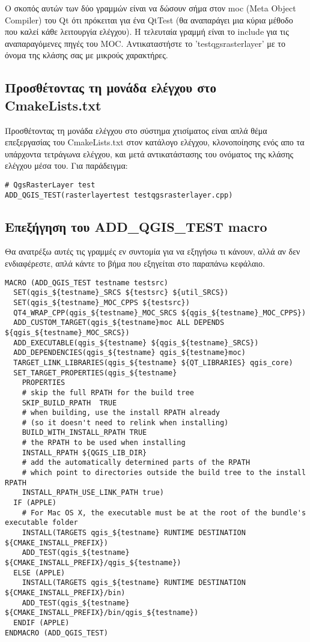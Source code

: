 Ο σκοπός αυτών των δύο γραμμών είναι να δώσουν σήμα στον moc (Meta Object Compiler) του Qt ότι πρόκειται για ένα QtTest (θα αναπαράγει μια κύρια μέθοδο που καλεί κάθε λειτουργία ελέγχου). Η τελευταία γραμμή είναι το include για τις αναπαραγόμενες πηγές του MOC. Αντικαταστήστε το ’testqgsrasterlayer’ με το όνομα της κλάσης σας με μικρούς χαρακτήρες.

\hypertarget{toc50}{}
\subsection{Προσθέτοντας τη μονάδα ελέγχου στο CmakeLists.txt}
Προσθέτοντας τη μονάδα ελέγχου στο σύστημα χτισίματος είναι απλά θέμα επεξεργασίας του CmakeLists.txt στον κατάλογο ελέγχου, κλονοποίησης ενός απο τα υπάρχοντα τετράγωνα ελέγχου, και μετά αντικατάστασης του ονόματος της κλάσης ελέγχου μέσα του. Για παράδειγμα:

\begin{verbatim}
# QgsRasterLayer test
ADD_QGIS_TEST(rasterlayertest testqgsrasterlayer.cpp)
\end{verbatim}

\hypertarget{toc51}{}
\subsection{Επεξήγηση του ADD\_QGIS\_TEST macro}
Θα ανατρέξω αυτές τις γραμμές εν συντομία για να εξηγήσω τι κάνουν, αλλά αν δεν ενδιαφέρεστε, απλά κάντε το βήμα που εξηγείται στο παραπάνω κεφάλαιο.

\begin{verbatim}
MACRO (ADD_QGIS_TEST testname testsrc)
  SET(qgis_${testname}_SRCS ${testsrc} ${util_SRCS})
  SET(qgis_${testname}_MOC_CPPS ${testsrc})
  QT4_WRAP_CPP(qgis_${testname}_MOC_SRCS ${qgis_${testname}_MOC_CPPS})
  ADD_CUSTOM_TARGET(qgis_${testname}moc ALL DEPENDS ${qgis_${testname}_MOC_SRCS})
  ADD_EXECUTABLE(qgis_${testname} ${qgis_${testname}_SRCS})
  ADD_DEPENDENCIES(qgis_${testname} qgis_${testname}moc)
  TARGET_LINK_LIBRARIES(qgis_${testname} ${QT_LIBRARIES} qgis_core)
  SET_TARGET_PROPERTIES(qgis_${testname}
    PROPERTIES
    # skip the full RPATH for the build tree
    SKIP_BUILD_RPATH  TRUE
    # when building, use the install RPATH already
    # (so it doesn't need to relink when installing)
    BUILD_WITH_INSTALL_RPATH TRUE
    # the RPATH to be used when installing
    INSTALL_RPATH ${QGIS_LIB_DIR}
    # add the automatically determined parts of the RPATH
    # which point to directories outside the build tree to the install RPATH
    INSTALL_RPATH_USE_LINK_PATH true)
  IF (APPLE)
    # For Mac OS X, the executable must be at the root of the bundle's executable folder
    INSTALL(TARGETS qgis_${testname} RUNTIME DESTINATION ${CMAKE_INSTALL_PREFIX})
    ADD_TEST(qgis_${testname} ${CMAKE_INSTALL_PREFIX}/qgis_${testname})
  ELSE (APPLE)
    INSTALL(TARGETS qgis_${testname} RUNTIME DESTINATION ${CMAKE_INSTALL_PREFIX}/bin)
    ADD_TEST(qgis_${testname} ${CMAKE_INSTALL_PREFIX}/bin/qgis_${testname})
  ENDIF (APPLE)
ENDMACRO (ADD_QGIS_TEST)
\end{verbatim}


